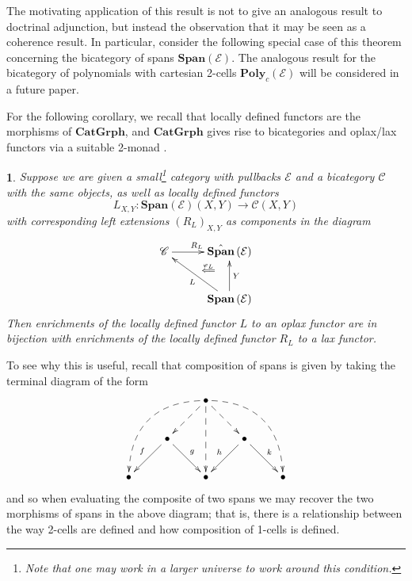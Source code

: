 \documentclass[a4paper,oneside,english]{amsart}
\numberwithin{equation}{section}
\numberwithin{figure}{section}
\theoremstyle{plain}
\theoremstyle{definition}
\theoremstyle{remark}
\theoremstyle{definition}
\theoremstyle{plain}
\theoremstyle{plain}
\newtheorem{cor}[thm]{\protect\corollaryname}
\theoremstyle{plain}
\providecommand{\corollaryname}{Corollary}
\begin{document}
The motivating application of this result is not to give an analogous
result to doctrinal adjunction, but instead the observation that it
may be seen as a coherence result. In particular, consider the following
special case of this theorem concerning the bicategory of spans $\mathbf{Span}\left(\mathcal{E}\right)$.
The analogous result for the bicategory of polynomials with cartesian
2-cells $\mathbf{Poly}_{c}\left(\mathcal{E}\right)$ will be considered
in a future paper. 

For the following corollary, we recall that locally defined functors
are the morphisms of $\mathbf{CatGrph}$, and $\mathbf{CatGrph}$
gives rise to bicategories and oplax/lax functors via a suitable 2-monad
\cite{icons}.
\begin{cor}
Suppose we are given a small\footnote{Note that one may work in a larger universe to work around this condition.}
category with pullbacks $\mathcal{E}$ and a bicategory $\mathscr{C}$
with the same objects, as well as locally defined functors
\[
L_{X,Y}:\mathbf{Span}\left(\mathcal{E}\right)\left(X,Y\right)\to\mathscr{C}\left(X,Y\right)
\]
with corresponding left extensions $\left(R_{L}\right)_{X,Y}$ as
components in the diagram 
\[
\xymatrix@=1em{\mathscr{C}\ar@{->}[rr]^{R_{L}} &  & \hat{\mathbf{Span}}\left(\mathcal{E}\right)\ar@{}[ld]|-{\quad\stackrel{\varphi_{L}}{\Longleftarrow}}\\
 & \;\\
 &  & \mathbf{Span}\left(\mathcal{E}\right)\ar[uu]_{Y}\ar@{->}[uull]^{L}
}
\]
Then enrichments of the locally defined functor $L$ to an oplax functor
are in bijection with enrichments of the locally defined functor $R_{L}$
to a lax functor.
\end{cor}
To see why this is useful, recall that composition of spans is given
by taking the terminal diagram of the form
\[
\xymatrix{ &  & \bullet\ar@{-->}[dd]\ar@{-->}[ld]\ar@{-->}[rd]\ar@/_{2pc}/@{-->}[ldld]\ar@/^{2pc}/@{-->}[rdrd]\\
 & \bullet\ar[ld]_{f}\ar[rd]^{g} &  & \bullet\ar[ld]_{h}\ar[rd]^{k}\\
\bullet &  & \bullet &  & \bullet
}
\]
and so when evaluating the composite of two spans we may recover the
two morphisms of spans in the above diagram; that is, there is a relationship
between the way 2-cells are defined and how composition of 1-cells
is defined.
\end{document}

